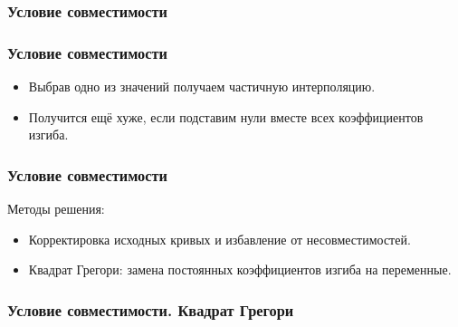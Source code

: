 \documentclass[14pt]{beamer}
\begin{document}
\begin{frame}
\frametitle{Условие совместимости}
\end{frame}

\begin{frame}
\frametitle{Условие совместимости}
\begin{itemize}
  \item Выбрав одно из значений получаем частичную интерполяцию.
  \item Получится ещё хуже, если подставим нули вместе всех коэффициентов изгиба.
\end{itemize}
\end{frame}

\begin{frame}
\frametitle{Условие совместимости}
Методы решения:
\begin{itemize}
  \item Корректировка исходных кривых и избавление от несовместимостей.
  \item Квадрат Грегори: замена постоянных коэффициентов изгиба на переменные.
\end{itemize}
\end{frame}

\begin{frame}
\frametitle{Условие совместимости. Квадрат Грегори}
\end{frame}
\end{document}
